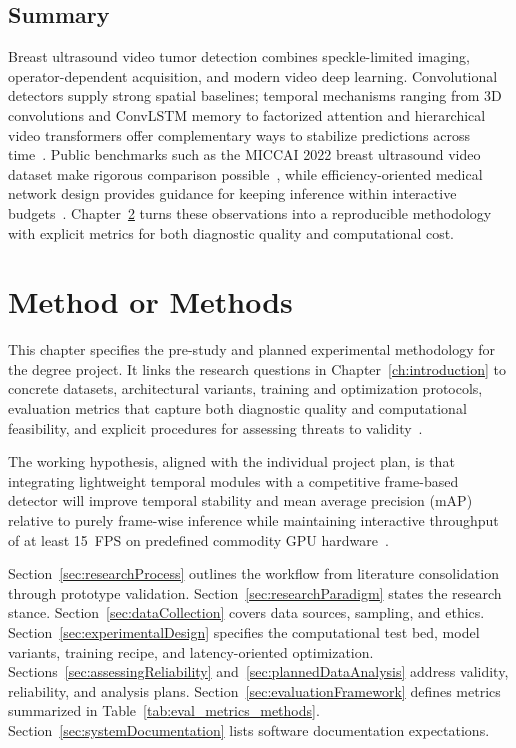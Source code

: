 \documentclass[
english,                 %
bibtex,                  %
]{kththesis}
\numberwithin{listing}{chapter}
\begin{document}
\section{Summary}

Breast ultrasound video tumor detection combines speckle-limited imaging, operator-dependent acquisition, and modern video deep learning.
Convolutional detectors supply strong spatial baselines; temporal mechanisms ranging from $3\mathrm{D}$ convolutions and ConvLSTM memory to factorized attention and hierarchical video transformers offer complementary ways to stabilize predictions across time~\cite{huang2023_3dcnn_video_review,shi2015_convlstm,bertasius2021_spacetime_attention,liu2022_video_swin_transformer}.
Public benchmarks such as the MICCAI 2022 breast ultrasound video dataset make rigorous comparison possible~\cite{lin2022_buv_miccai}, while efficiency-oriented medical network design provides guidance for keeping inference within interactive budgets~\cite{liu2023_edgemednet}.
Chapter~\ref{ch:methods} turns these observations into a reproducible methodology with explicit metrics for both diagnostic quality and computational cost.

\cleardoublepage
\chapter{Method or Methods}
\label{ch:methods}

This chapter specifies the pre-study and planned experimental methodology for the degree project.
It links the research questions in Chapter~\ref{ch:introduction} to concrete datasets, architectural variants, training and optimization protocols, evaluation metrics that capture both diagnostic quality and computational feasibility, and explicit procedures for assessing threats to validity~\cite{litjens2017_survey_deep_medical,dan2024_breast_us_dl_review,lin2022_buv_miccai}.

The working hypothesis, aligned with the individual project plan, is that integrating lightweight temporal modules with a competitive frame-based detector will improve temporal stability and mean average precision (mAP) relative to purely frame-wise inference while maintaining interactive throughput of at least \SI{15}{FPS} on predefined commodity GPU hardware~\cite{lin2022_buv_miccai,shi2015_convlstm,feichtenhofer2019_slowfast,liu2023_edgemednet}.

Section~\ref{sec:researchProcess} outlines the workflow from literature consolidation through prototype validation.
Section~\ref{sec:researchParadigm} states the research stance.
Section~\ref{sec:dataCollection} covers data sources, sampling, and ethics.
Section~\ref{sec:experimentalDesign} specifies the computational test bed, model variants, training recipe, and latency-oriented optimization.
Sections~\ref{sec:assessingReliability} and~\ref{sec:plannedDataAnalysis} address validity, reliability, and analysis plans.
Section~\ref{sec:evaluationFramework} defines metrics summarized in Table~\ref{tab:eval_metrics_methods}.
Section~\ref{sec:systemDocumentation} lists software documentation expectations.
\end{document}
